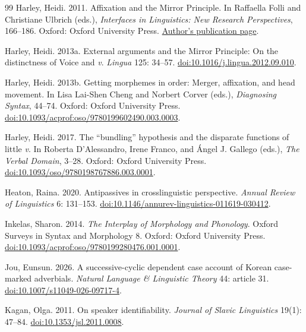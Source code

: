 \begin{thebibliography}{99}
Harley, Heidi. 2011.
Affixation and the Mirror Principle.
In Raffaella Folli and Christiane Ulbrich (eds.),
\textit{Interfaces in Linguistics: New Research Perspectives}, 166--186.
Oxford: Oxford University Press.
\href{https://heidiharley.com/pubs/affixation-and-the-mirror-principle/}{Author's publication page}.

Harley, Heidi. 2013a.
External arguments and the Mirror Principle: On the distinctness of Voice and \textit{v}.
\textit{Lingua} 125: 34--57.
\href{https://doi.org/10.1016/j.lingua.2012.09.010}{doi:10.1016/j.lingua.2012.09.010}.

Harley, Heidi. 2013b.
Getting morphemes in order: Merger, affixation, and head movement.
In Lisa Lai-Shen Cheng and Norbert Corver (eds.),
\textit{Diagnosing Syntax}, 44--74.
Oxford: Oxford University Press.
\href{https://doi.org/10.1093/acprof:oso/9780199602490.003.0003}{doi:10.1093/acprof:oso/9780199602490.003.0003}.

Harley, Heidi. 2017.
The ``bundling'' hypothesis and the disparate functions of little \textit{v}.
In Roberta D'Alessandro, Irene Franco, and \'Angel J. Gallego (eds.),
\textit{The Verbal Domain}, 3--28.
Oxford: Oxford University Press.
\href{https://doi.org/10.1093/oso/9780198767886.003.0001}{doi:10.1093/oso/9780198767886.003.0001}.

Heaton, Raina. 2020.
Antipassives in crosslinguistic perspective.
\textit{Annual Review of Linguistics} 6: 131--153.
\href{https://doi.org/10.1146/annurev-linguistics-011619-030412}{doi:10.1146/annurev-linguistics-011619-030412}.

Inkelas, Sharon. 2014.
\textit{The Interplay of Morphology and Phonology}.
Oxford Surveys in Syntax and Morphology 8.
Oxford: Oxford University Press.
\href{https://doi.org/10.1093/acprof:oso/9780199280476.001.0001}{doi:10.1093/acprof:oso/9780199280476.001.0001}.

Jou, Eunsun. 2026.
A successive-cyclic dependent case account of Korean case-marked adverbials.
\textit{Natural Language \& Linguistic Theory} 44: article 31.
\href{https://doi.org/10.1007/s11049-026-09717-4}{doi:10.1007/s11049-026-09717-4}.

Kagan, Olga. 2011.
On speaker identifiability.
\textit{Journal of Slavic Linguistics} 19(1): 47--84.
\href{https://doi.org/10.1353/jsl.2011.0008}{doi:10.1353/jsl.2011.0008}.


\end{thebibliography}
